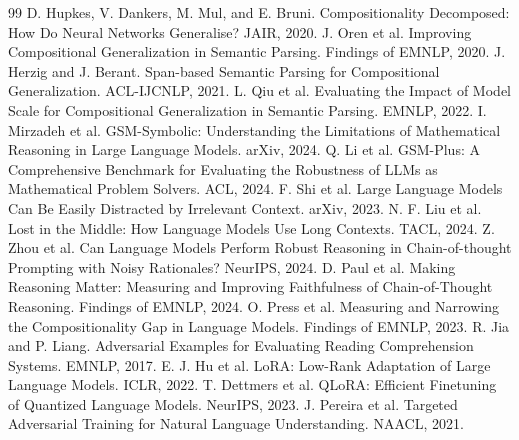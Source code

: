 \documentclass[UTF8,11pt,a4paper]{ctexart}
\theoremstyle{plain}
\begin{document}
\begin{thebibliography}{99}
 D. Hupkes, V. Dankers, M. Mul, and E. Bruni. Compositionality Decomposed: How Do Neural Networks Generalise? JAIR, 2020.
 J. Oren et al. Improving Compositional Generalization in Semantic Parsing. Findings of EMNLP, 2020.
 J. Herzig and J. Berant. Span-based Semantic Parsing for Compositional Generalization. ACL-IJCNLP, 2021.
 L. Qiu et al. Evaluating the Impact of Model Scale for Compositional Generalization in Semantic Parsing. EMNLP, 2022.
 I. Mirzadeh et al. GSM-Symbolic: Understanding the Limitations of Mathematical Reasoning in Large Language Models. arXiv, 2024.
 Q. Li et al. GSM-Plus: A Comprehensive Benchmark for Evaluating the Robustness of LLMs as Mathematical Problem Solvers. ACL, 2024.
 F. Shi et al. Large Language Models Can Be Easily Distracted by Irrelevant Context. arXiv, 2023.
 N. F. Liu et al. Lost in the Middle: How Language Models Use Long Contexts. TACL, 2024.
 Z. Zhou et al. Can Language Models Perform Robust Reasoning in Chain-of-thought Prompting with Noisy Rationales? NeurIPS, 2024.
 D. Paul et al. Making Reasoning Matter: Measuring and Improving Faithfulness of Chain-of-Thought Reasoning. Findings of EMNLP, 2024.
 O. Press et al. Measuring and Narrowing the Compositionality Gap in Language Models. Findings of EMNLP, 2023.
 R. Jia and P. Liang. Adversarial Examples for Evaluating Reading Comprehension Systems. EMNLP, 2017.
 E. J. Hu et al. LoRA: Low-Rank Adaptation of Large Language Models. ICLR, 2022.
 T. Dettmers et al. QLoRA: Efficient Finetuning of Quantized Language Models. NeurIPS, 2023.
 J. Pereira et al. Targeted Adversarial Training for Natural Language Understanding. NAACL, 2021.
\end{thebibliography}
\end{document}
